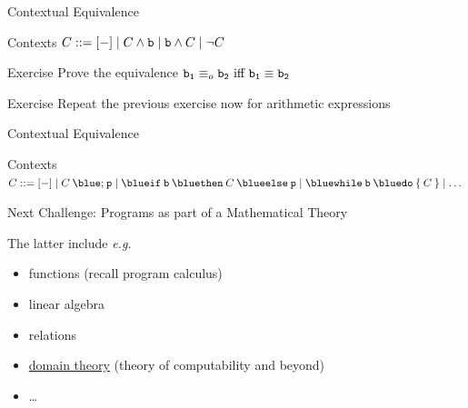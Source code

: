 \documentclass{beamer}
\begin{document}
\begin{frame}{Contextual Equivalence}

        \begin{block}{Contexts}
                $C ::= [-] \mid C \wedge \mathtt{b} \mid \mathtt{b} \wedge C \mid \neg C$
        \end{block} 

        \bigskip
        \begin{block}{Exercise}
                Prove the equivalence $\mathtt{b_1} \equiv_o \mathtt{b_2} 
                \text{ iff } \mathtt{b_1} \equiv \mathtt{b_2}$
        \end{block}

        \pause
        \bigskip
        \begin{block}{Exercise}
        Repeat the previous exercise now for arithmetic expressions
        \end{block}
\end{frame}

\begin{frame}{Contextual Equivalence}

        \begin{block}{Contexts}
                $C ::= [-] \mid C \> \prog{\blue ;} \> \prog{p} 
                \mid 
                \mathtt{{\blue if} \> b \> {\blue then} \>} C \mathtt{\> {\blue else} \> p} 
                \mid
                \mathtt{{\blue while} \> b \> {\blue do} \> \{ \>} C \mathtt{\> \}}
                \mid \dots$
        \end{block} 

        \pause
        \bigskip
        \bigskip
        \centering

\end{frame}

\begin{frame}{Next Challenge: Programs as part of a Mathematical Theory}
        
        \begin{center}
         \hspace{0.5cm} \scalebox{1.5}{${\hookrightarrow}$} 
        \hspace{0.5cm} 
        \end{center}

        \medskip
        The latter include \emph{e.g.}
        \begin{itemize}
                \item functions (recall program calculus)
                \item linear algebra
                \item relations
                \item \alert{\underline{domain theory}} (theory of computability and beyond)
                \item \dots
        \end{itemize}
\end{frame}
\end{document}

